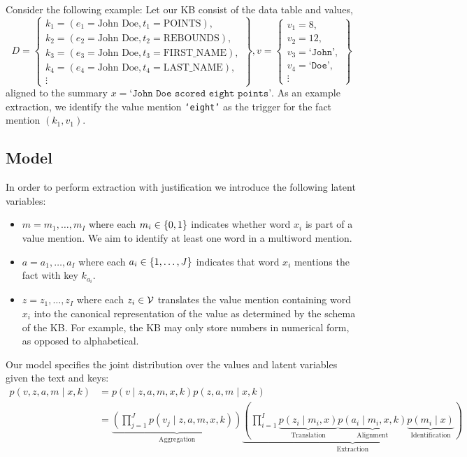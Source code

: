 \documentclass[12pt]{article}
\begin{document}
Consider the following example:
Let our KB consist of the data table and values,
$$
D = \left\{\begin{array}{c}
    k_1 = (e_1 = \textrm{John Doe}, t_1 = \textrm{POINTS}), \\
    k_2 = (e_2 = \textrm{John Doe}, t_2 = \textrm{REBOUNDS}), \\
    k_3 = (e_3 = \textrm{John Doe}, t_3 = \textrm{FIRST\_NAME}),\\
    k_4 = (e_4 = \textrm{John Doe}, t_4 = \textrm{LAST\_NAME}), \\
    \vdots
\end{array}\right\},
v = \left\{\begin{array}{c}
v_1 = 8,\\
v_2 = 12,\\
v_3 = \texttt{`John'},\\
v_4 = \texttt{`Doe'},\\
\vdots 
\end{array}\right\}
$$
aligned to the summary $x = \texttt{`John Doe scored eight points'}$.
As an example extraction, we identify the value mention
\texttt{`eight'} as the trigger for the fact mention $(k_1, v_1)$.

\subsection{Model}
In order to perform extraction with justification we
introduce the following latent variables:
\begin{itemize}
\item $m = m_1, \ldots, m_I$ where each $m_i \in \left\{0,1\right\}$
    indicates whether word $x_i$ is part of a value mention.
    We aim to identify at least one word in a multiword mention.
\item $a = a_1, \ldots, a_I$ where each $a_i \in \left\{1, \ldots, J\right\}$
    indicates that word $x_i$ mentions the fact with key $k_{a_i}$.
\item $z = z_1, \ldots, z_I$ where each $z_i \in \mathcal{V}$
    translates the value mention containing word $x_i$
    into the canonical representation of
    the value as determined by the schema of the KB.
    For example, the KB may only store numbers in numerical form,
    as opposed to alphabetical.
\end{itemize}

Our model specifies the joint distribution over the values and latent variables
given the text and keys:
\begin{equation}
\label{eqn:prob}
\begin{aligned}
p(v,z,a,m\mid x,k)
&= p(v\mid z,a,m,x,k)p(z,a,m\mid x,k)\\
&= \underbrace{\left(\prod_{j=1}^J p(v_j\mid z,a,m,x,k)\right)}_{\textrm{Aggregation}}
    \underbrace{\left(\prod_{i=1}^I
        \underbrace{p(z_i\mid m_i,x)}_{\textrm{Translation}}
        \underbrace{p(a_i\mid m_i,x,k)}_{\textrm{Alignment}}
        \underbrace{p(m_i\mid x)}_{\textrm{Identification}}
    \right)}_{\textrm{Extraction}}
\end{aligned}
\end{equation}
\end{document}
